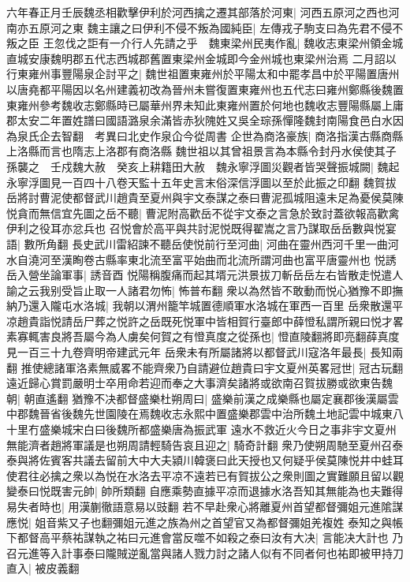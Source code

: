 六年春正月壬辰魏丞相歡擊伊利於河西擒之遷其部落於河東|{
	河西五原河之西也河南亦五原河之東}
魏主讓之曰伊利不侵不叛為國純臣|{
	左傳戎子駒支曰為先君不侵不叛之臣}
王忽伐之詎有一介行人先請之乎　魏東梁州民夷作亂|{
	魏收志東梁州領金城直城安康魏明郡五代志西城郡舊置東梁州金城即今金州城也東梁州治焉}
二月詔以行東雍州事豐陽泉企討平之|{
	魏世祖置東雍州於平陽太和中罷孝昌中於平陽置唐州以唐堯都平陽因以名州建義初改為晉州未嘗復置東雍州也五代志曰雍州鄭縣後魏置東雍州參考魏收志鄭縣時已屬華州界未知此東雍州置於何地也魏收志豐陽縣屬上庸郡太安二年置姓譜曰國語潞泉余滿皆赤狄隗姓又吳全琮孫憚隆魏封南陽食邑白水因為泉氏企去智翻　考異曰北史作泉仚今從周書}
企世為商洛豪族|{
	商洛指漢古縣商縣上洛縣而言也隋志上洛郡有商洛縣}
魏世祖以其曾祖景言為本縣令封丹水侯使其子孫襲之　壬戍魏大赦　癸亥上耕籍田大赦　魏永寧浮圖災觀者皆哭聲振城闕|{
	魏起永寧浮圖見一百四十八卷天監十五年史言末俗深信浮圖以至於此振之印翻}
魏賀拔岳將討曹泥使都督武川趙貴至夏州與宇文泰謀之泰曰曹泥孤城阻遠未足為憂侯莫陳悦貪而無信宜先圖之岳不聽|{
	曹泥附高歡岳不從宇文泰之言急於致討蓋欲報高歡禽伊利之役耳亦忿兵也}
召悦會於高平與共討泥悦既得翟嵩之言乃謀取岳岳數與悦宴語|{
	數所角翻}
長史武川雷紹諫不聽岳使悦前行至河曲|{
	河曲在靈州西河千里一曲河水自澆河至漢眴卷古縣率東北流至富平始曲而北流所謂河曲也富平唐靈州也}
悦誘岳入營坐論軍事|{
	誘音酉}
悦陽稱腹痛而起其壻元洪景拔刀斬岳岳左右皆散走悦遣人諭之云我别受旨止取一人諸君勿怖|{
	怖普布翻}
衆以為然皆不敢動而悦心猶豫不即撫納乃還入隴屯水洛城|{
	我朝以渭州籠竿城置德順軍水洛城在軍西一百里}
岳衆散還平凉趙貴詣悦請岳尸葬之悦許之岳既死悦軍中皆相賀行臺郎中薛憕私謂所親曰悦才畧素寡輒害良將吾屬今為人虜矣何賀之有憕真度之從孫也|{
	憕直陵翻將即亮翻薛真度見一百三十九卷齊明帝建武元年}
岳衆未有所屬諸將以都督武川寇洛年最長|{
	長知兩翻}
推使總諸軍洛素無威畧不能齊衆乃自請避位趙貴曰宇文夏州英畧冠世|{
	冠古玩翻}
遠近歸心賞罰嚴明士卒用命若迎而奉之大事濟矣諸將或欲南召賀拔勝或欲東告魏朝|{
	朝直遙翻}
猶豫不决都督盛樂杜朔周曰|{
	盛樂前漢之成樂縣也屬定襄郡後漢屬雲中郡魏晉省後魏先世園陵在焉魏收志永熙中置盛樂郡雲中治所魏土地記雲中城東八十里冇盛樂城宋白曰後魏所都盛樂唐為振武軍}
遠水不救近火今日之事非宇文夏州無能濟者趙將軍議是也朔周請輕騎告哀且迎之|{
	騎奇計翻}
衆乃使朔周馳至夏州召泰泰與將佐賓客共議去留前大中大夫潁川韓褒曰此天授也又何疑乎侯莫陳悦井中蛙耳使君往必擒之衆以為悦在水洛去平凉不遠若已有賀拔公之衆則圖之實難願且留以觀變泰曰悦既害元帥|{
	帥所類翻}
自應乘勢直據平凉而退據水洛吾知其無能為也夫難得易失者時也|{
	用漢蒯徹語意易以豉翻}
若不早赴衆心將離夏州首望都督彌姐元進隂謀應悦|{
	姐音紫又子也翻彌姐元進之族為州之首望官又為都督彌姐羌複姓}
泰知之與帳下都督高平蔡祐謀執之祐曰元進會當反噬不如殺之泰曰汝有大决|{
	言能决大計也}
乃召元進等入計事泰曰隴賊逆亂當與諸人戮力討之諸人似有不同者何也祐即被甲持刀直入|{
	被皮義翻}
